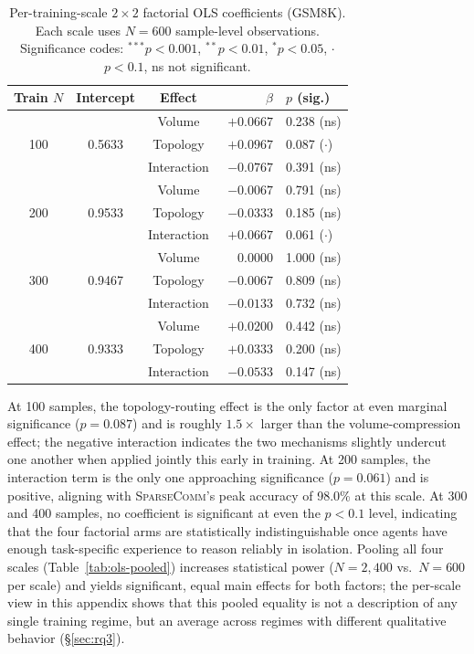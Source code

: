 \documentclass[11pt]{article}
\newcommand{\sys}{\textsc{SparseComm}\xspace}
\begin{document}
\begin{table}[H]
\centering
\footnotesize
\setlength{\tabcolsep}{3pt}
\begin{tabular}{cccrl}
\toprule
Train $N$ & Intercept & Effect & $\beta$ & $p$ (sig.) \\
\midrule
\multirow{3}{*}{100} & \multirow{3}{*}{0.5633}
  & Volume      & $+0.0667$ & 0.238 (ns) \\
& & Topology    & $+0.0967$ & 0.087 ($\cdot$) \\
& & Interaction & $-0.0767$ & 0.391 (ns) \\
\midrule
\multirow{3}{*}{200} & \multirow{3}{*}{0.9533}
  & Volume      & $-0.0067$ & 0.791 (ns) \\
& & Topology    & $-0.0333$ & 0.185 (ns) \\
& & Interaction & $+0.0667$ & 0.061 ($\cdot$) \\
\midrule
\multirow{3}{*}{300} & \multirow{3}{*}{0.9467}
  & Volume      & $\phantom{-}0.0000$ & 1.000 (ns) \\
& & Topology    & $-0.0067$ & 0.809 (ns) \\
& & Interaction & $-0.0133$ & 0.732 (ns) \\
\midrule
\multirow{3}{*}{400} & \multirow{3}{*}{0.9333}
  & Volume      & $+0.0200$ & 0.442 (ns) \\
& & Topology    & $+0.0333$ & 0.200 (ns) \\
& & Interaction & $-0.0533$ & 0.147 (ns) \\
\bottomrule
\end{tabular}
\caption{Per-training-scale $2\times2$ factorial OLS coefficients (GSM8K).
Each scale uses $N=600$ sample-level observations.
Significance codes: $^{***}p{<}0.001$, $^{**}p{<}0.01$, $^{*}p{<}0.05$,
$\cdot$ $p{<}0.1$, ns not significant.}
\label{tab:ols-per-scale}
\end{table}

At 100 samples, the topology-routing effect is the only factor at even
marginal significance ($p=0.087$) and is roughly $1.5\times$ larger than the
volume-compression effect; the negative interaction indicates the two
mechanisms slightly undercut one another when applied jointly this early in
training. At 200 samples, the interaction term is the only one approaching
significance ($p=0.061$) and is positive, aligning with \sys's peak accuracy
of 98.0\% at this scale. At 300 and 400 samples, no coefficient is
significant at even the $p<0.1$ level, indicating that the four factorial
arms are statistically indistinguishable once agents have enough
task-specific experience to reason reliably in isolation. Pooling all four
scales (Table~\ref{tab:ols-pooled}) increases statistical power
($N=2{,}400$ vs.\ $N=600$ per scale) and yields significant, equal main
effects for both factors; the per-scale view in this appendix shows that
this pooled equality is not a description of any single training regime,
but an average across regimes with different qualitative behavior
(\S\ref{sec:rq3}).
\end{document}
